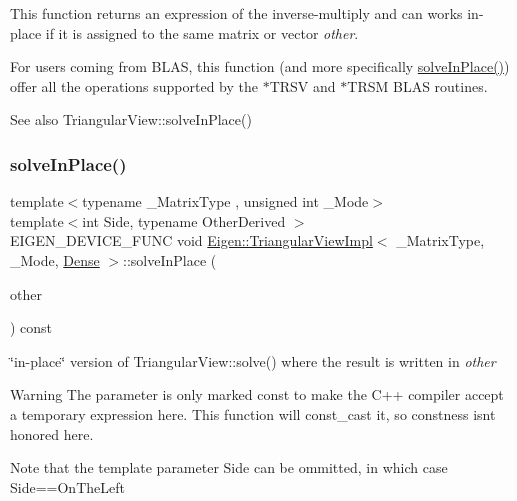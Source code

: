 This function returns an expression of the inverse-\/multiply and can works in-\/place if it is assigned to the same matrix or vector {\itshape other}.

For users coming from B\+L\+AS, this function (and more specifically \mbox{\hyperlink{class_eigen_1_1_triangular_view_impl_3_01___matrix_type_00_01___mode_00_01_dense_01_4_a7862f7a93e5ec9d1ea3fc144cca0e5f7}{solve\+In\+Place()}}) offer all the operations supported by the {\ttfamily $\ast$\+T\+R\+SV} and {\ttfamily $\ast$\+T\+R\+SM} B\+L\+AS routines.

\begin{DoxySeeAlso}{See also}
Triangular\+View\+::solve\+In\+Place() 
\end{DoxySeeAlso}
\mbox{\label{class_eigen_1_1_triangular_view_impl_3_01___matrix_type_00_01___mode_00_01_dense_01_4_a7862f7a93e5ec9d1ea3fc144cca0e5f7}} 
\subsubsection{\texorpdfstring{solveInPlace()}{solveInPlace()}}
{\footnotesize\ttfamily template$<$typename \+\_\+\+Matrix\+Type , unsigned int \+\_\+\+Mode$>$ \\
template$<$int Side, typename Other\+Derived $>$ \\
E\+I\+G\+E\+N\+\_\+\+D\+E\+V\+I\+C\+E\+\_\+\+F\+U\+NC void \mbox{\hyperlink{class_eigen_1_1_triangular_view_impl}{Eigen\+::\+Triangular\+View\+Impl}}$<$ \+\_\+\+Matrix\+Type, \+\_\+\+Mode, \mbox{\hyperlink{struct_eigen_1_1_dense}{Dense}} $>$\+::solve\+In\+Place (\begin{DoxyParamCaption}\item[{const \mbox{\hyperlink{class_eigen_1_1_matrix_base}{Matrix\+Base}}$<$ Other\+Derived $>$ \&}]{other }\end{DoxyParamCaption}) const}

\char`\"{}in-\/place\char`\"{} version of Triangular\+View\+::solve() where the result is written in {\itshape other} 

\begin{DoxyWarning}{Warning}
The parameter is only marked \textquotesingle{}const\textquotesingle{} to make the C++ compiler accept a temporary expression here. This function will const\+\_\+cast it, so constness isn\textquotesingle{}t honored here.
\end{DoxyWarning}
Note that the template parameter {\ttfamily Side} can be ommitted, in which case {\ttfamily Side==On\+The\+Left} 

